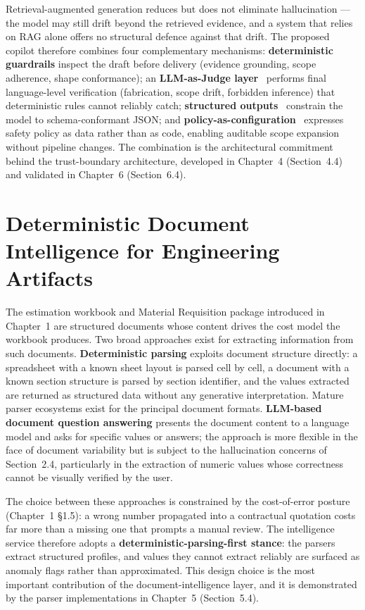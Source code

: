 Retrieval-augmented generation reduces but does not eliminate hallucination --- the model may still drift beyond the retrieved evidence, and a system that relies on RAG alone offers no structural defence against that drift. The proposed copilot therefore combines four complementary mechanisms: \textbf{deterministic guardrails} inspect the draft before delivery (evidence grounding, scope adherence, shape conformance); an \textbf{LLM-as-Judge layer}~\cite{zheng2023judge} performs final language-level verification (fabrication, scope drift, forbidden inference) that deterministic rules cannot reliably catch; \textbf{structured outputs}~\cite{anthropic_structured_outputs_docs} constrain the model to schema-conformant JSON; and \textbf{policy-as-configuration}~\cite{bai2022constitutional} expresses safety policy as data rather than as code, enabling auditable scope expansion without pipeline changes. The combination is the architectural commitment behind the trust-boundary architecture, developed in Chapter~4 (Section~4.4) and validated in Chapter~6 (Section~6.4).

\section{Deterministic Document Intelligence for Engineering Artifacts}
The estimation workbook and Material Requisition package introduced in Chapter~1 are structured documents whose content drives the cost model the workbook produces. Two broad approaches exist for extracting information from such documents. \textbf{Deterministic parsing} exploits document structure directly: a spreadsheet with a known sheet layout is parsed cell by cell, a document with a known section structure is parsed by section identifier, and the values extracted are returned as structured data without any generative interpretation. Mature parser ecosystems exist for the principal document formats. \textbf{LLM-based document question answering} presents the document content to a language model and asks for specific values or answers; the approach is more flexible in the face of document variability but is subject to the hallucination concerns of Section~2.4, particularly in the extraction of numeric values whose correctness cannot be visually verified by the user.

The choice between these approaches is constrained by the cost-of-error posture (Chapter~1 §1.5): a wrong number propagated into a contractual quotation costs far more than a missing one that prompts a manual review. The intelligence service therefore adopts a \textbf{deterministic-parsing-first stance}: the parsers extract structured profiles, and values they cannot extract reliably are surfaced as anomaly flags rather than approximated. This design choice is the most important contribution of the document-intelligence layer, and it is demonstrated by the parser implementations in Chapter~5 (Section~5.4).

